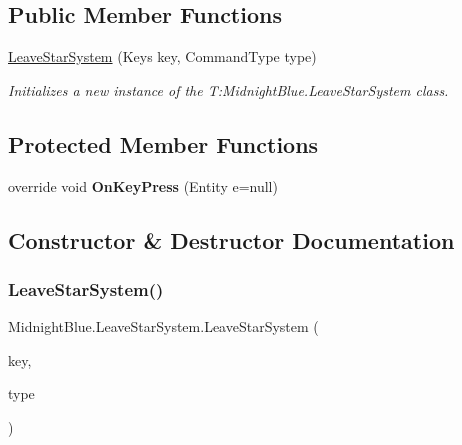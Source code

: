 \subsection*{Public Member Functions}
\begin{DoxyCompactItemize}
\item 
\hyperlink{class_midnight_blue_1_1_leave_star_system_a6793d6a941afd58a9e9030d8aec1fe83}{Leave\+Star\+System} (Keys key, Command\+Type type)
\begin{DoxyCompactList}\small\item\em Initializes a new instance of the T\+:\+Midnight\+Blue.\+Leave\+Star\+System class. \end{DoxyCompactList}\end{DoxyCompactItemize}
\subsection*{Protected Member Functions}
\begin{DoxyCompactItemize}
\item 
\hypertarget{class_midnight_blue_1_1_leave_star_system_ad2e048edbe7a4816d9ed8fc87cf4eb91}{}\label{class_midnight_blue_1_1_leave_star_system_ad2e048edbe7a4816d9ed8fc87cf4eb91} 
override void {\bfseries On\+Key\+Press} (Entity e=null)
\end{DoxyCompactItemize}


\subsection{Constructor \& Destructor Documentation}
\hypertarget{class_midnight_blue_1_1_leave_star_system_a6793d6a941afd58a9e9030d8aec1fe83}{}\label{class_midnight_blue_1_1_leave_star_system_a6793d6a941afd58a9e9030d8aec1fe83} 
\subsubsection{\texorpdfstring{Leave\+Star\+System()}{LeaveStarSystem()}}
{\footnotesize\ttfamily Midnight\+Blue.\+Leave\+Star\+System.\+Leave\+Star\+System (\begin{DoxyParamCaption}\item[{Keys}]{key,  }\item[{Command\+Type}]{type }\end{DoxyParamCaption})\hspace{0.3cm}{\ttfamily [inline]}}



